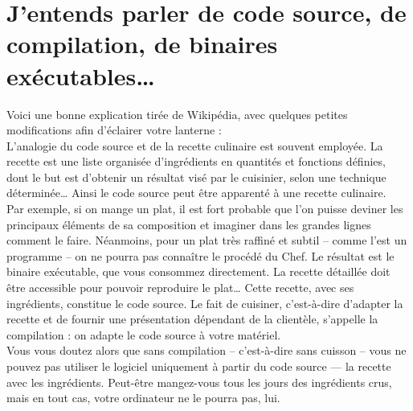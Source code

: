 {\section{J'entends parler de code source, de compilation, de binaires exécutables\ldots{}}
\label{RefSourceBinaire}
Voici une bonne explication tirée de Wikipédia, avec quelques petites modifications afin d'éclairer votre lanterne :\\
L'analogie du code source et de la recette culinaire est souvent employée. La recette est une liste organisée d'ingrédients en quantités et fonctions définies, dont le but est d'obtenir un résultat visé par le cuisinier, selon une technique déterminée\ldots{} Ainsi le code source peut être apparenté à une recette culinaire.\\
Par exemple, si on mange un plat, il est fort probable que l'on puisse deviner les principaux éléments de sa composition et imaginer dans les grandes lignes comment le faire. Néanmoins, pour un plat très raffiné et subtil -- comme l'est un programme -- on ne pourra pas connaître le procédé du Chef. Le résultat est le binaire exécutable, que vous consommez directement. La recette détaillée doit être accessible pour pouvoir reproduire le plat\ldots{} Cette recette, avec ses ingrédients, constitue le code source. Le fait de cuisiner, c'est-à-dire d'adapter la recette et de fournir une présentation dépendant de la clientèle, s'appelle la compilation : on adapte le code source à votre matériel.\\ 
Vous vous doutez alors que sans compilation -- c'est-à-dire sans cuisson -- vous ne pouvez pas utiliser le logiciel uniquement à partir du code source --- la recette avec les ingrédients. Peut-être mangez-vous tous les jours des ingrédients crus, mais en tout cas, votre ordinateur ne le pourra pas, lui.
}
